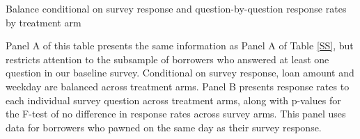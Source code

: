 

\begin{table}[H]
\caption{Balance conditional on survey response and question-by-question response rates by treatment arm}
\label{SS_cond_survet}
\begin{center}
\scriptsize{}
\end{center}
\scriptsize

Panel A of this table presents the same information as Panel A of Table \ref{SS}, but restricts attention to the subsample of borrowers who answered at least one question in our baseline survey. Conditional on survey response, loan amount and weekday are balanced across treatment arms. Panel B presents response rates to each individual survey question across treatment arms, along with p-values for the F-test of no difference in response rates across survey arms. This panel uses data for borrowers who pawned on the same day as their survey response. 


\end{table}



